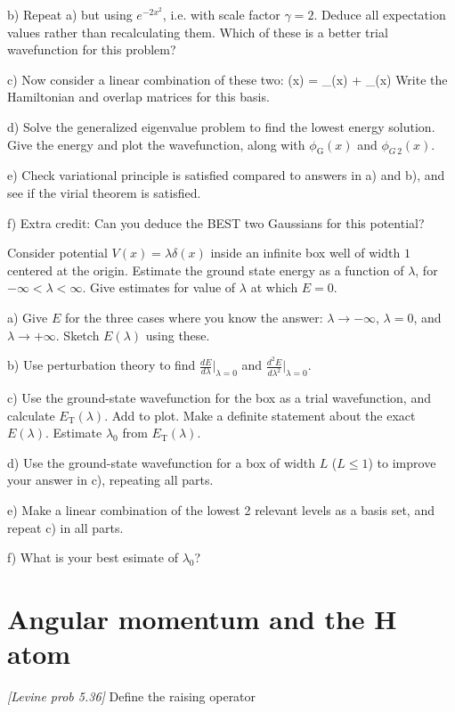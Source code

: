 b) Repeat a) but using $e^{-2x^2}$, i.e. with scale factor $\gamma = 2$. Deduce
all expectation values rather than recalculating them. Which of these is a better
trial wavefunction for this problem?

c) Now consider a linear combination of these two:
\be
   \phi(x) = \alpha\phi_{}(x) + \beta\phi_{}(x)
\ee
Write the Hamiltonian and overlap matrices for this basis.

d) Solve the generalized eigenvalue problem to find the lowest energy solution. Give
the energy and plot the wavefunction, along with $\phi_{\text{G}}(x)$ and $\phi_{G\,2}(x)$.

e) Check variational principle is satisfied compared to answers in a) and b), and see
if the virial theorem is satisfied.

f) Extra credit: Can you deduce the BEST two Gaussians for this potential?

\newpage
{}
Consider potential $V(x) = \lambda\delta(x)$ inside an infinite box well of width $1$ centered
at the origin. Estimate the ground state energy as a function of $\lambda$, for $-\infty < \lambda < \infty$.
Give estimates for value of $\lambda$ at which $E=0$.

a) Give $E$ for the three cases where you know the answer: $\lambda \rightarrow -\infty$,
$\lambda=0$, and $\lambda \rightarrow +\infty$. Sketch $E(\lambda)$ using these.

b) Use perturbation theory to find $\frac{dE}{d\lambda}\Bigg|_{\lambda=0}$ and $\frac{d^2E}{d\lambda^2}\Bigg|_{\lambda=0}$.

c) Use the ground-state wavefunction for the box as a trial wavefunction, and calculate
$E_{\text{T}}(\lambda)$. Add to plot. Make a definite statement about the exact $E(\lambda)$.
Estimate $\lambda_0$ from $E_{\text{T}}(\lambda)$.

d) Use the ground-state wavefunction for a box of width $L$ ($L \leq 1$) to improve
your answer in c), repeating all parts.

e) Make a linear combination of the lowest 2 relevant levels as a basis set, and repeat
c) in all parts.

f) What is your best esimate of $\lambda_0$?

\newpage
\part{Angular momentum and the H atom}
\newpage
{}
{\em [Levine prob 5.36]}
Define the raising operator


